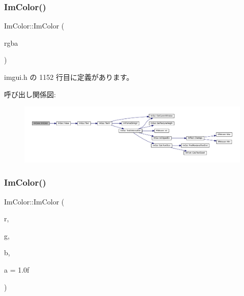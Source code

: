 \subsubsection{\texorpdfstring{Im\+Color()}{ImColor()}\hspace{0.1cm}{\footnotesize\ttfamily [3/5]}}
{\footnotesize\ttfamily Im\+Color\+::\+Im\+Color (\begin{DoxyParamCaption}\item[{\mbox{\hyperlink{imgui_8h_a118cff4eeb8d00e7d07ce3d6460eed36}{Im\+U32}}}]{rgba }\end{DoxyParamCaption})\hspace{0.3cm}{\ttfamily [inline]}}



 imgui.\+h の 1152 行目に定義があります。

呼び出し関係図\+:\nopagebreak
\begin{figure}[H]
\begin{center}
\leavevmode
\includegraphics[width=350pt]{struct_im_color_ad306332841a2b1f903f40262a19f9412_cgraph}
\end{center}
\end{figure}
\mbox{\label{struct_im_color_a92b53917ca9d90a7207b18270ff5453d}} 
\subsubsection{\texorpdfstring{Im\+Color()}{ImColor()}\hspace{0.1cm}{\footnotesize\ttfamily [4/5]}}
{\footnotesize\ttfamily Im\+Color\+::\+Im\+Color (\begin{DoxyParamCaption}\item[{float}]{r,  }\item[{float}]{g,  }\item[{float}]{b,  }\item[{float}]{a = {\ttfamily 1.0f} }\end{DoxyParamCaption})\hspace{0.3cm}{\ttfamily [inline]}}



